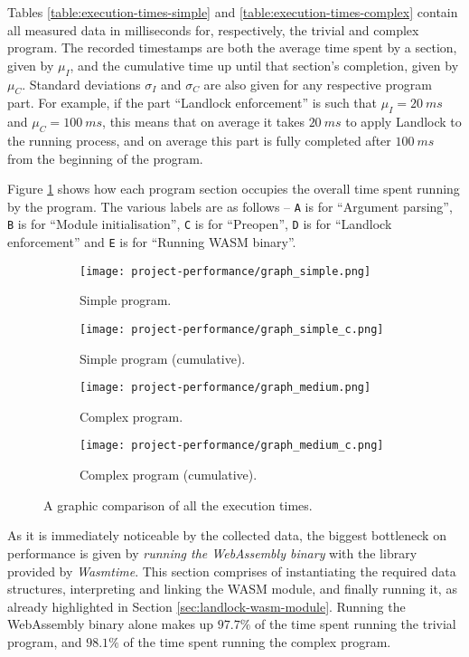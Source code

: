 Tables \ref{table:execution-times-simple} and \ref{table:execution-times-complex} contain
all measured data in milliseconds for, respectively, the trivial and complex program.
The recorded timestamps are both the average time spent by a section, given by $\mu_I$,
and the cumulative time up until that section's completion, given by $\mu_C$.
Standard deviations $\sigma_I$ and $\sigma_C$ are also given for any respective program part.
For example, if the part ``Landlock enforcement'' is such that $\mu_I = 20\ ms$ and $\mu_C = 100\ ms$,
this means that on average it takes $20\ ms$ to apply Landlock to the running process, and on average this part
is fully completed after $100\ ms$ from the beginning of the program.

Figure \ref{fig:perf-execution-times-comparison} shows how each program section
occupies the overall time spent running by the program. The various labels are as follows
-- \texttt{A} is for ``Argument parsing'', \texttt{B} is for ``Module initialisation'',
\texttt{C} is for ``Preopen'', \texttt{D} is for ``Landlock enforcement'' and
\texttt{E} is for ``Running WASM binary''.

\begin{figure}[ht!]
  \centering
  
  \begin{subfigure}[b]{0.49\textwidth}
    \texttt{[image: project-performance/graph\_simple.png]}
    \caption{Simple program.}
  \end{subfigure}
  \begin{subfigure}[b]{0.49\textwidth}
    \texttt{[image: project-performance/graph\_simple\_c.png]}
    \caption{Simple program (cumulative).}
  \end{subfigure}

  \begin{subfigure}[b]{0.49\textwidth}
    \texttt{[image: project-performance/graph\_medium.png]}
    \caption{Complex program.}
  \end{subfigure}
  \begin{subfigure}[b]{0.49\textwidth}
    \texttt{[image: project-performance/graph\_medium\_c.png]}
    \caption{Complex program (cumulative).}
  \end{subfigure}

  \caption{A graphic comparison of all the execution times.}
  \label{fig:perf-execution-times-comparison}
\end{figure}

As it is immediately noticeable by the collected data, the biggest bottleneck on performance is given
by \textit{running the WebAssembly binary} with the library provided by \textit{Wasmtime}.
This section comprises of instantiating the required data structures, interpreting and linking the WASM module,
and finally running it, as already highlighted in Section \ref{sec:landlock-wasm-module}.
Running the WebAssembly binary alone makes up $97.7 \%$ of the time spent running the trivial program, and $98.1 \%$ of the time
spent running the complex program.

